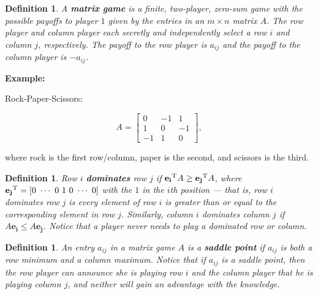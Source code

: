 \documentclass{article}
\theoremstyle{colontheorem}
\newtheorem{definition}[theorem]{Definition}
\newcommand{\T}{^\textnormal{T}}
\newenvironment{Def}
{
	\begin{mdframed}[backgroundcolor=DefGreen!10]
	\begin{definition}
}
{
	\end{definition}
	\end{mdframed}
	
	\vspace{.15in}
}
\newenvironment{Example}
{
	\begin{mdframed}
	\textbf{Example:}%
}
{
	\end{mdframed}
	
	\vspace{.15in}
}
\begin{document}
\begin{Def}
	
	A \textbf{matrix game} is a finite, two-player, zero-sum game with the possible payoffs to player $1$ given by the entries in an $m \times n$ matrix $A$. The row player and column player each secretly and independently select a row $i$ and column $j$, respectively. The payoff to the row player is $a_{ij}$ and the payoff to the column player is $-a_{ij}$.
	
\end{Def}



\begin{Example}
	Rock-Paper-Scissors:
	
	$$
		A = \begin{bmatrix}
			0 & -1 & 1\\
			1 & 0 & -1\\
			-1 & 1 & 0
		\end{bmatrix},
	$$
	
	where rock is the first row/column, paper is the second, and scissors is the third.
	
\end{Example}



\begin{Def}
	
	Row $i$ \textbf{dominates} row $j$ if $\mathbf{e_i}\T A \geq \mathbf{e_j}\T A$, where $\mathbf{e_j}\T = [0\ \cdots\ 0\ 1\ 0\ \cdots\ 0]$ with the $1$ in the $i$th position --- that is, row $i$ dominates row $j$ is every element of row $i$ is greater than or equal to the corresponding element in row $j$. Similarly, column $i$ dominates column $j$ if $A \mathbf{e_i} \leq A \mathbf{e_j}$. Notice that a player never needs to play a dominated row or column.
	
\end{Def}



\begin{Def}
	
	An entry $a_{ij}$ in a matrix game $A$ is a \textbf{saddle point} if $a_{ij}$ is both a row minimum and a column maximum. Notice that if $a_{ij}$ is a saddle point, then the row player can announce she is playing row $i$ and the column player that he is playing column $j$, and neither will gain an advantage with the knowledge.
	
\end{Def}
\end{document}
